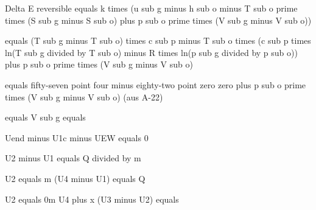 Delta E reversible equals k times (u sub g minus h sub o minus T sub o prime times (S sub g minus S sub o) plus p sub o prime times (V sub g minus V sub o))

equals (T sub g minus T sub o) times c sub p minus T sub o times (c sub p times ln(T sub g divided by T sub o) minus R times ln(p sub g divided by p sub o)) plus p sub o prime times (V sub g minus V sub o)

equals fifty-seven point four minus eighty-two point zero zero plus p sub o prime times (V sub g minus V sub o) (aus A-22)

equals V sub g equals

Uend minus U1c minus UEW equals 0

U2 minus U1 equals Q divided by m

U2 equals m (U4 minus U1) equals Q

U2 equals 0m U4 plus x (U3 minus U2) equals